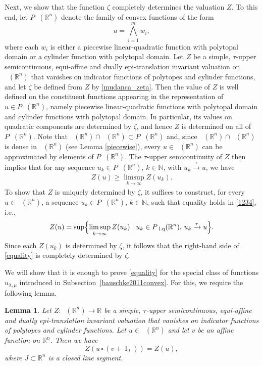 \documentclass[11pt]{article}
\newtheorem{lema}[teo]{Lemma}
\theoremstyle{definition} %
\newcommand{\RR}{(\mathbb{R}^n)}
\DeclareMathOperator{\I}{I}
\DeclareMathOperator{\PA}{Conv_{p.a}}
\DeclareMathOperator{\LQ}{_{l.q}}
\DeclareMathOperator{\LP}{Conv_{lp}}
\newcommand{\seq}{\xrightarrow{\tau}}
\begin{document}
Next, we show that the function $\zeta$ completely determines the valuation $Z$. To this end, let $P\LQ\RR$ denote the family of convex functions of the form
$$u=\bigwedge_{i=1}^m w_i,$$
where  each $w_i$ is either a piecewise linear-quadratic function with polytopal domain or a cylinder function with  polytopal domain. Let $Z$ be a simple, $\tau$-upper semicontinuous, equi-affine and dually epi-translation invariant valuation on $\LP\RR$ that vanishes on indicator functions of polytopes and cylinder functions, and let $\zeta$ be defined from $Z$ by \eqref{mudanca_zeta}. Then the value of $Z$ is well defined on the constituent functions appearing in the representation of $u \in P\LQ\RR$, namely piecewise linear-quadratic functions with polytopal domain and cylinder functions with polytopal domain. In particular, its values on quadratic components are determined by $\zeta$, and hence $Z$ is determined on all of $P\LQ\RR$. Note that  $\PA\RR\cap \LP(\mathbb{R}^n)\subset P\LQ\RR$ and, since $\PA\RR\cap \LP(\mathbb{R}^n)$ is dense in $\LP\RR$ (see Lemma \ref{piecewise}),  every $u\in \LP\RR$ can be approximated by elements of   $P\LQ\RR$. The $\tau$-upper semicontinuity of $Z$ then implies that for any sequence $u_k\in P\LQ\RR$, $k\in\mathbb{N}$, with $u_k\seq u$, we have 
\begin{align}\label{1234}
  Z(u)\geq \limsup_{k\rightarrow \infty} Z(u_k).  
\end{align}
To show that $Z$ is uniquely determined by $\zeta$, it suffices to construct, for every  $u\in \LP(\mathbb{R}^n)$, a sequence  $u_k\in P\LQ(\mathbb{R}^n)$, $k\in\mathbb{N}$, such that equality holds in \eqref{1234}, i.e.,
\begin{align}\label{equality}
    Z(u)=\sup\Bigl\{\limsup_{k\rightarrow \infty} Z(u_k)\mid u_k\in P\LQ(\mathbb{R}^n),\, u_k\seq u\Bigr\}.
\end{align}
Since each $Z(u_k)$ is determined by $\zeta$, it follows that the right-hand side of \eqref{equality} is completely determined by $\zeta$.



We will show that it is enough to prove \eqref{equality} for the special class of functions $u_{\lambda,\mu}$ introduced in Subsection~\ref{bauschke2011convex}.  
For this, we require the following lemma.


\begin{lema}\label{invariant}
Let $Z:\LP\RR\rightarrow\mathbb{R}$ be a simple, $\tau$-upper semicontinuous, equi-affine and  dually epi-translation   invariant valuation that   vanishes on  indicator functions of polytopes and cylinder functions. Let $u \in \LP(\mathbb{R}^n)$ and let $v$ be an affine function on $\mathbb{R}^n$.
Then we have
$$
Z(u\,\square\, (v+\I_J))=Z(u),
$$
where $J\subset \mathbb{R}^n$ is a closed line segment. 
\end{lema}
\end{document}
